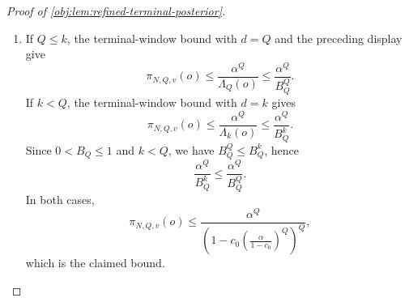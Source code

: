 \begin{proof}[Proof of \cref{obj:lem:refined-terminal-posterior}]
\begin{enumerate}
\item
If \(Q\le k\), the terminal-window bound with \(d=Q\) and the preceding display give
\[
\pi_{N,Q,v}(o)
\le
\frac{\alpha^Q}{\Lambda_Q(o)}
\le
\frac{\alpha^Q}{B_Q^Q}.
\]
If \(k<Q\), the terminal-window bound with \(d=k\) gives
\[
\pi_{N,Q,v}(o)
\le
\frac{\alpha^Q}{\Lambda_k(o)}
\le
\frac{\alpha^Q}{B_Q^k}.
\]
Since \(0<B_Q\le1\) and \(k<Q\), we have \(B_Q^Q\le B_Q^k\), hence
\[
\frac{\alpha^Q}{B_Q^k}
\le
\frac{\alpha^Q}{B_Q^Q}.
\]
In both cases,
\[
\pi_{N,Q,v}(o)
\le
\frac{\alpha^Q}
{\left(1-c_0\left(\frac{\alpha}{1-c_0}\right)^Q\right)^Q},
\]
which is the claimed bound. %
\end{enumerate}
\end{proof}
